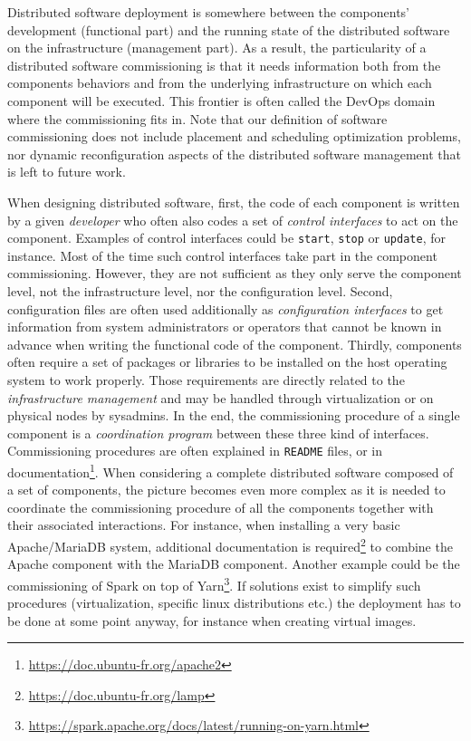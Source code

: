 Distributed software deployment is somewhere between the components' development (functional part) and the running state of the distributed software on the infrastructure (management part). As a result, the particularity of a distributed software commissioning is that it needs information both from the components behaviors and from the underlying infrastructure on which each component will be executed. This frontier is often called the DevOps domain where the commissioning fits in. Note that our definition of software commissioning does not include placement and scheduling optimization problems, nor dynamic reconfiguration aspects of the distributed software management that is left to future work.

When designing distributed software, first, the code of each component is written by a given \emph{developer} who often also codes a set of \emph{control 	interfaces} to act on the component. Examples of control interfaces could be \texttt{start}, \texttt{stop} or \texttt{update}, for instance. Most of the time such control interfaces take part in the component commissioning. However, they are not sufficient as they only serve the component level, not the infrastructure level, nor the configuration level. Second, configuration files are often used additionally as \emph{configuration interfaces} to get information from system administrators or operators that cannot be known in advance when writing the functional code of the component. Thirdly, components often require a set of packages or libraries to be installed on the host operating system to work properly. Those requirements are directly related to the \emph{infrastructure management} and may be handled through virtualization or on physical nodes by sysadmins.
%
In the end, the commissioning procedure of a single component is a \emph{coordination program} between these three kind of interfaces. Commissioning
procedures are often explained in \texttt{README} files, or in documentation\footnote{\url{https://doc.ubuntu-fr.org/apache2}}.
%
When considering a complete distributed software composed of a set of
components, the picture becomes even more complex as it is needed to coordinate
the commissioning procedure of all the components together with their associated
interactions. For instance, when installing a very basic Apache/MariaDB system,
additional documentation is
required\footnote{\url{https://doc.ubuntu-fr.org/lamp}} to combine the Apache
component with the MariaDB component. Another example could be the commissioning
of Spark on top of
Yarn\footnote{\url{https://spark.apache.org/docs/latest/running-on-yarn.html}}. If solutions exist to simplify such procedures (\eg virtualization, specific linux distributions etc.) the deployment has to be done at some point anyway, for instance when creating virtual images.

